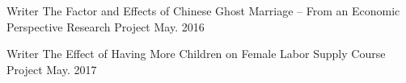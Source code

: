 


\begin{cventries}


\cventry
{Writer} %
{The Factor and Effects of Chinese Ghost Marriage -- From an Economic Perspective} %
{Research Project} %
{May. 2016} %
{ %
}


\cventry
{Writer} %
{The Effect of Having More Children on Female Labor Supply} %
{Course Project} %
{May. 2017} %
{ %
}


\end{cventries}
